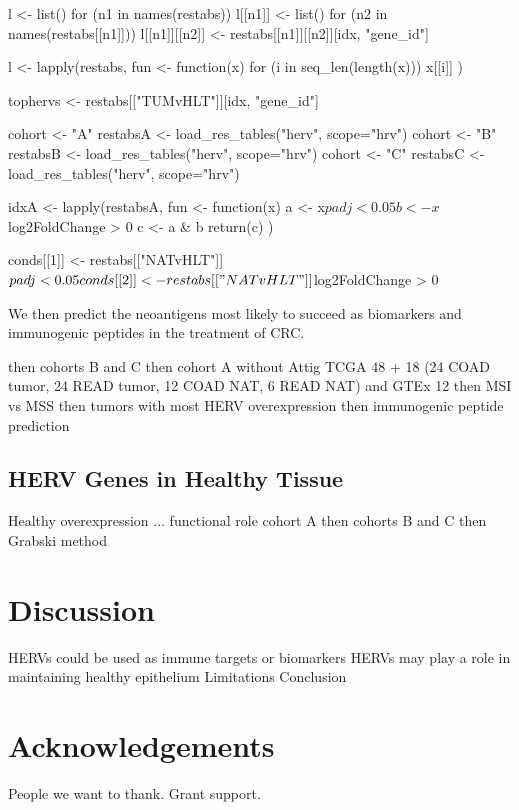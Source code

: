 \documentclass[11pt,letterpaper]{article}
\begin{document}
l <- list()
for (n1 in names(restabs)) {
    l[[n1]] <- list()
    for (n2 in names(restabs[[n1]])) {
        l[[n1]][[n2]] <- restabs[[n1]][[n2]][idx, "gene_id"]
    }
}

l <- lapply(restabs, fun <- function(x) {
    for (i in seq_len(length(x))) {
        x[[i]]
    }
})


tophervs <- restabs[["TUMvHLT"]][idx, "gene_id"]


cohort <- "A"
restabsA <- load_res_tables("herv", scope="hrv")
cohort <- "B"
restabsB <- load_res_tables("herv", scope="hrv")
cohort <- "C"
restabsC <- load_res_tables("herv", scope="hrv")

idxA <- lapply(restabsA, fun <- function(x) {
    a <- x$padj < 0.05
    b <- x$log2FoldChange > 0
    c <- a & b
    return(c)
})

conds[[1]] <- restabs[["NATvHLT"]]$padj < 0.05
conds[[2]] <- restabs[["NATvHLT"]]$log2FoldChange > 0



We then predict the neoantigens most likely to succeed as biomarkers and immunogenic peptides in the treatment of CRC.


then cohorts B and C
then cohort A without Attig TCGA 48 + 18 (24 COAD tumor, 24 READ tumor, 12 COAD NAT, 6 READ NAT) and GTEx 12
then MSI vs MSS
then tumors with most HERV overexpression
then immunogenic peptide prediction

\subsection*{HERV Genes in Healthy Tissue}

Healthy overexpression ... functional role
cohort A
then cohorts B and C
then Grabski method

\section*{Discussion}

HERVs could be used as immune targets or biomarkers
HERVs may play a role in maintaining healthy epithelium
Limitations
Conclusion

\section*{Acknowledgements}

People we want to thank. Grant support.



\end{document}
